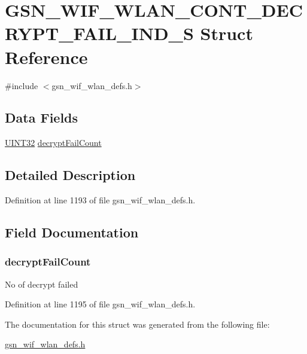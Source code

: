 \hypertarget{a00376}{
\section{GSN\_\-WIF\_\-WLAN\_\-CONT\_\-DECRYPT\_\-FAIL\_\-IND\_\-S Struct Reference}
\label{a00376}
}


{\ttfamily \#include $<$gsn\_\-wif\_\-wlan\_\-defs.h$>$}

\subsection*{Data Fields}
\begin{DoxyCompactItemize}
\item 
\hyperlink{a00660_gae1e6edbbc26d6fbc71a90190d0266018}{UINT32} \hyperlink{a00376_a860b5b1fb735758b5f569e511ae8ebbe}{decryptFailCount}
\end{DoxyCompactItemize}


\subsection{Detailed Description}


Definition at line 1193 of file gsn\_\-wif\_\-wlan\_\-defs.h.



\subsection{Field Documentation}
\hypertarget{a00376_a860b5b1fb735758b5f569e511ae8ebbe}{
\subsubsection[{decryptFailCount}]{ {\bf decryptFailCount}}}
\label{a00376_a860b5b1fb735758b5f569e511ae8ebbe}
No of decrypt failed 

Definition at line 1195 of file gsn\_\-wif\_\-wlan\_\-defs.h.



The documentation for this struct was generated from the following file:\begin{DoxyCompactItemize}
\item 
\hyperlink{a00613}{gsn\_\-wif\_\-wlan\_\-defs.h}\end{DoxyCompactItemize}
